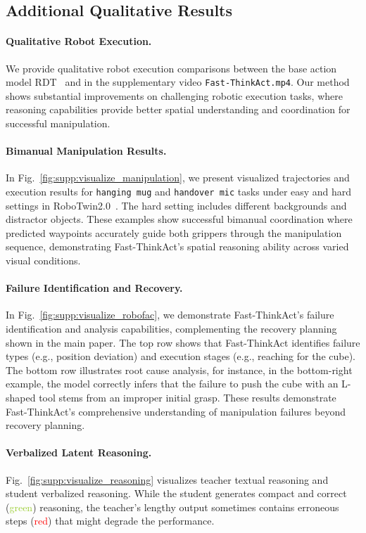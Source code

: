 \subsection{Additional Qualitative Results}

\paragraph{Qualitative Robot Execution.} We provide qualitative robot execution comparisons between the base action model RDT~\cite{liu2024rdt} and \ours{} in the supplementary video \texttt{Fast-ThinkAct.mp4}. Our method shows substantial improvements on challenging robotic execution tasks, where reasoning capabilities provide better spatial understanding and coordination for successful manipulation.


\paragraph{Bimanual Manipulation Results.} In Fig.~\ref{fig:supp:visualize_manipulation}, we present visualized trajectories and execution results for \texttt{hanging mug} and \texttt{handover mic} tasks under easy and hard settings in RoboTwin2.0~\cite{chen2025robotwin2}. The hard setting includes different backgrounds and distractor objects. These examples show successful bimanual coordination where predicted waypoints accurately guide both grippers through the manipulation sequence, demonstrating Fast-ThinkAct's spatial reasoning ability across varied visual conditions.

\paragraph{Failure Identification and Recovery.} In Fig.~\ref{fig:supp:visualize_robofac}, we demonstrate Fast-ThinkAct's failure identification and analysis capabilities, complementing the recovery planning shown in the main paper. The top row shows that Fast-ThinkAct identifies failure types (e.g., position deviation) and execution stages (e.g., reaching for the cube). The bottom row illustrates root cause analysis, for instance, in the bottom-right example, the model correctly infers that the failure to push the cube with an L-shaped tool stems from an improper initial grasp. These results demonstrate Fast-ThinkAct's comprehensive understanding of manipulation failures beyond recovery planning.


\paragraph{Verbalized Latent Reasoning.} Fig.~\ref{fig:supp:visualize_reasoning} visualizes teacher textual reasoning and student verbalized reasoning. While the student generates compact and correct (\textcolor{YellowGreen}{green}) reasoning, the teacher's lengthy output sometimes contains erroneous steps (\textcolor{red}{red}) that might degrade the performance.



